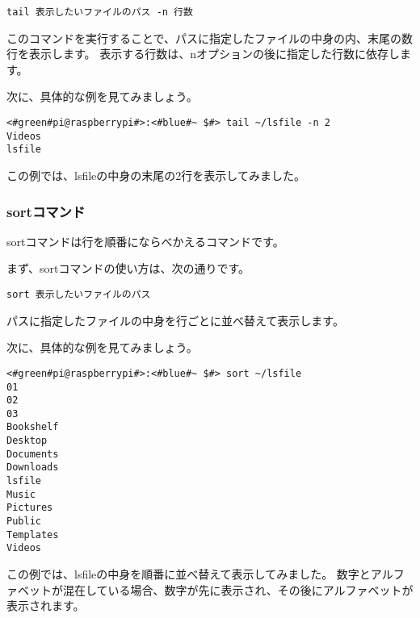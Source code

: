 \begin{lstlisting}[caption=tailコマンドの使い方, label=tail_usage]
tail 表示したいファイルのパス -n 行数
\end{lstlisting}

このコマンドを実行することで、パスに指定したファイルの中身の内、末尾の数行を表示します。
表示する行数は、nオプションの後に指定した行数に依存します。

次に、具体的な例を見てみましょう。

\begin{lstlisting}[caption=tailコマンドの実行例, label=shuf_example]
<#green#pi@raspberrypi#>:<#blue#~ $#> tail ~/lsfile -n 2
Videos
lsfile
\end{lstlisting}

この例では、lsfileの中身の末尾の2行を表示してみました。

\begin{tcolorbox}[title=\useOmetoi]
    \begin{enumerate}
    \end{enumerate}
\end{tcolorbox}

\subsubsection{sortコマンド}
sortコマンドは行を順番にならべかえるコマンドです。

まず、sortコマンドの使い方は、次の通りです。

\begin{lstlisting}[caption=sortコマンドの使い方, label=sort_usage]
sort 表示したいファイルのパス
\end{lstlisting}

パスに指定したファイルの中身を行ごとに並べ替えて表示します。

次に、具体的な例を見てみましょう。

\begin{lstlisting}[caption=sortコマンドの実行例, label=sort_example]
<#green#pi@raspberrypi#>:<#blue#~ $#> sort ~/lsfile
01
02
03
Bookshelf
Desktop
Documents
Downloads
lsfile
Music
Pictures
Public
Templates
Videos
\end{lstlisting}

この例では、lsfileの中身を順番に並べ替えて表示してみました。
数字とアルファベットが混在している場合、数字が先に表示され、その後にアルファベットが表示されます。

